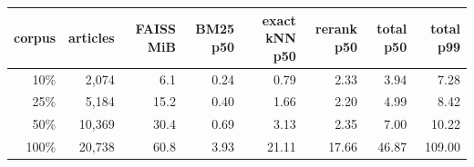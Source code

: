 \begin{tabular}{@{}rrrrrrrr@{}}
\toprule
corpus & articles & FAISS MiB & BM25 p50 & exact kNN p50 & rerank p50 & total p50 & total p99 \\
\midrule
10\% & 2,074 & 6.1 & 0.24 & 0.79 & 2.33 & 3.94 & 7.28 \\
25\% & 5,184 & 15.2 & 0.40 & 1.66 & 2.20 & 4.99 & 8.42 \\
50\% & 10,369 & 30.4 & 0.69 & 3.13 & 2.35 & 7.00 & 10.22 \\
100\% & 20,738 & 60.8 & 3.93 & 21.11 & 17.66 & 46.87 & 109.00 \\
\bottomrule
\end{tabular}
